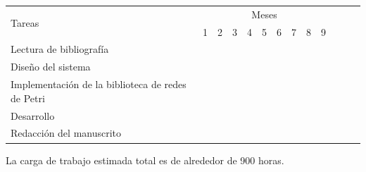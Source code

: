\documentclass[12pt]{article}
\begin{document}
\begin{center}
    \def\arraystretch{1.5}
    \begin{tabular}{ |l|c|c|c|c|c|c|c|c|c|c|c|c| }

        \hline
        \multirow{2}{1em}{Tareas}                         & \multicolumn{9}{|c|}{Meses}                                                                                                                                                         \\  \cline{2-10} &
        1                                                 & 2                           & 3                & 4                & 5                & 6                & 7                & 8                & 9                                   \\  \hline
        Lectura de bibliografía                           & \cellcolor{gray}            & \cellcolor{gray} &                  &                  &                  &                  &                  &                  &                  \\
        \hline
        Diseño del sistema                                &                             & \cellcolor{gray} & \cellcolor{gray} &                  &                  &                  &                  &                  &                  \\
        \hline
        Implementación de la biblioteca de redes de Petri &                             & \cellcolor{gray} & \cellcolor{gray} & \cellcolor{gray} &                  &                  &                  &                  &                  \\
        \hline
        Desarrollo                                        &                             &                  &                  & \cellcolor{gray} & \cellcolor{gray} & \cellcolor{gray} & \cellcolor{gray} &                  &                  \\
        \hline
        Redacción del manuscrito                          &                             &                  &                  &                  &                  & \cellcolor{gray} & \cellcolor{gray} & \cellcolor{gray} & \cellcolor{gray} \\
        \hline
    \end{tabular}
\end{center}

La carga de trabajo estimada total es de alrededor de 900 horas.
\end{document}
